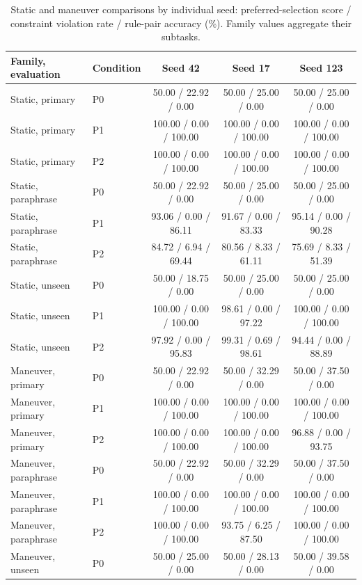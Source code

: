 \documentclass[10pt]{article}
\begin{document}
\begin{table}[tbp]
\centering\footnotesize\setlength{\tabcolsep}{3pt}
\caption{Static and maneuver comparisons by individual seed: preferred-selection score / constraint violation rate / rule-pair accuracy (\%). Family values aggregate their subtasks.}
\label{tab:sup-multitask-robust-seeds}
\begin{tabular}{llccc}
\toprule
Family, evaluation & Condition & Seed 42 & Seed 17 & Seed 123\\
\midrule
Static, primary & P0 & 50.00 / 22.92 / 0.00 & 50.00 / 25.00 / 0.00 & 50.00 / 25.00 / 0.00\\
Static, primary & P1 & 100.00 / 0.00 / 100.00 & 100.00 / 0.00 / 100.00 & 100.00 / 0.00 / 100.00\\
Static, primary & P2 & 100.00 / 0.00 / 100.00 & 100.00 / 0.00 / 100.00 & 100.00 / 0.00 / 100.00\\
Static, paraphrase & P0 & 50.00 / 22.92 / 0.00 & 50.00 / 25.00 / 0.00 & 50.00 / 25.00 / 0.00\\
Static, paraphrase & P1 & 93.06 / 0.00 / 86.11 & 91.67 / 0.00 / 83.33 & 95.14 / 0.00 / 90.28\\
Static, paraphrase & P2 & 84.72 / 6.94 / 69.44 & 80.56 / 8.33 / 61.11 & 75.69 / 8.33 / 51.39\\
Static, unseen & P0 & 50.00 / 18.75 / 0.00 & 50.00 / 25.00 / 0.00 & 50.00 / 25.00 / 0.00\\
Static, unseen & P1 & 100.00 / 0.00 / 100.00 & 98.61 / 0.00 / 97.22 & 100.00 / 0.00 / 100.00\\
Static, unseen & P2 & 97.92 / 0.00 / 95.83 & 99.31 / 0.69 / 98.61 & 94.44 / 0.00 / 88.89\\
Maneuver, primary & P0 & 50.00 / 22.92 / 0.00 & 50.00 / 32.29 / 0.00 & 50.00 / 37.50 / 0.00\\
Maneuver, primary & P1 & 100.00 / 0.00 / 100.00 & 100.00 / 0.00 / 100.00 & 100.00 / 0.00 / 100.00\\
Maneuver, primary & P2 & 100.00 / 0.00 / 100.00 & 100.00 / 0.00 / 100.00 & 96.88 / 0.00 / 93.75\\
Maneuver, paraphrase & P0 & 50.00 / 22.92 / 0.00 & 50.00 / 32.29 / 0.00 & 50.00 / 37.50 / 0.00\\
Maneuver, paraphrase & P1 & 100.00 / 0.00 / 100.00 & 100.00 / 0.00 / 100.00 & 100.00 / 0.00 / 100.00\\
Maneuver, paraphrase & P2 & 100.00 / 0.00 / 100.00 & 93.75 / 6.25 / 87.50 & 100.00 / 0.00 / 100.00\\
Maneuver, unseen & P0 & 50.00 / 25.00 / 0.00 & 50.00 / 28.13 / 0.00 & 50.00 / 39.58 / 0.00\\

\end{tabular}
\end{table}
\end{document}
